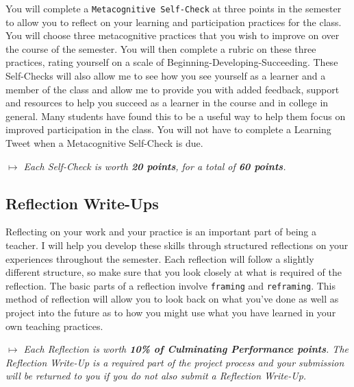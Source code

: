 \documentclass{tufte-handout}
\begin{document}
You will complete a \texttt{Metacognitive Self-Check} at three points in the semester to allow you to reflect on your learning and participation practices for the class. You will choose three metacognitive practices that you wish to improve on over the course of the semester. You will then complete a rubric on these three practices, rating yourself on a scale of Beginning-Developing-Succeeding. These Self-Checks will also allow me to see how you see yourself as a learner and a member of the class and allow me to provide you with added feedback, support and resources to help you succeed as a learner in the course and in college in general. Many students have found this to be a useful way to help them focus on improved participation in the class. You will not have to complete a Learning Tweet when a Metacognitive Self-Check is due.

\medskip\noindent\textit{$\mapsto$ Each Self-Check is worth \textbf{20 points}, for a total of \textbf{60 points}.}

\subsection{Reflection Write-Ups}

Reflecting on your work and your practice is an important part of being a teacher. I will help you develop these skills through structured reflections on your experiences throughout the semester. Each reflection will follow a slightly different structure, so make sure that you look closely at what is required of the reflection. The basic parts of a reflection involve \texttt{framing} and \texttt{reframing}. This method of reflection will allow you to look back on what you've done as well as project into the future as to how you might use what you have learned in your own teaching practices.

\medskip\noindent\textit{$\mapsto$ Each Reflection is worth \textbf{10\% of Culminating Performance points}. The Reflection Write-Up is a required part of the project process and your submission will be returned to you if you do not also submit a Reflection Write-Up.}
\end{document}
